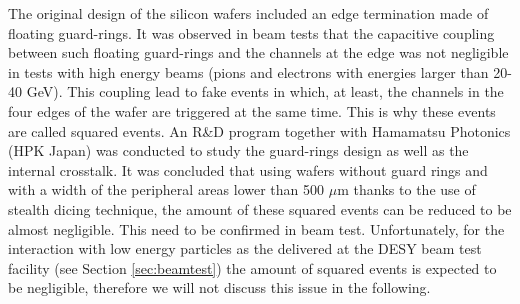 \documentclass[a4paper,11pt]{article}
\newcommand{\todo}[1]{\textcolor{red}{{#1}}}
\begin{document}
The original design of the silicon wafers included an edge termination made of floating guard-rings.
It was observed in beam tests \cite{Cornat:2015eoa,Cornat:2009zz} that the capacitive coupling between such floating guard-rings 
and the channels at the edge was not negligible in tests with high energy beams (pions and electrons with energies larger than 20-40 GeV).
This coupling lead to fake events in which, at least,
the channels in the four edges of the wafer are triggered at the same time. 
This is why these events are called squared events. 
An R\&D program together with Hamamatsu Photonics (HPK Japan) was conducted to study the guard-rings design 
as well as the internal crosstalk.
It was concluded that using wafers without guard rings and with a width of the peripheral areas lower than 
500 $\mu$m thanks to the use of stealth dicing technique, the amount of these squared events 
can be reduced to be almost negligible. This need to be confirmed in beam test.
Unfortunately, for the interaction with low energy particles as the delivered at the
DESY beam test facility (see Section \ref{sec:beamtest}) the
amount of squared events is expected to be negligible, therefore we will not discuss this issue in the following.



\end{document}

